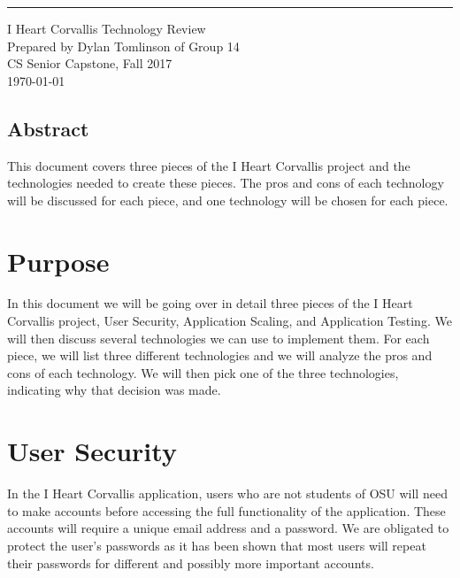 \documentclass{scrreprt}
\date{}
\begin{document}
\begin{flushright}
    \rule{16cm}{5pt}\vskip1cm
    \begin{bfseries}
        \Huge{I Heart Corvallis Technology Review}\\
        \vspace{1.9cm}
        \LARGE Prepared by Dylan Tomlinson of Group 14\\
        \vspace{1.9cm}
        \LARGE CS Senior Capstone, Fall 2017\\
        \vspace{1.9cm}
        \today\\
        \vspace{1.9cm}
    \end{bfseries}
\end{flushright}

\section*{Abstract}
This document covers three pieces of the I Heart Corvallis project and the technologies needed to create these pieces. The pros and cons of each technology will be discussed for each piece, and one technology will be chosen for each piece.
\tableofcontents


\chapter{Purpose}
In this document we will be going over in detail three pieces of the I Heart Corvallis project,
User Security, Application Scaling, and Application Testing. We will then discuss several
technologies we can use to implement them. For each piece, we will list three different
technologies and we will analyze the pros and cons of each technology. We will then pick one of
the three technologies, indicating why that decision was made.



\chapter{User Security} %
In the I Heart Corvallis application, users who are not students of OSU will need to make
accounts before accessing the full functionality of the application. These accounts will
require a unique email address and a password. We are obligated to protect the user's passwords
as it has been shown that most users will repeat their passwords for different and possibly
more important accounts.
\end{document}
